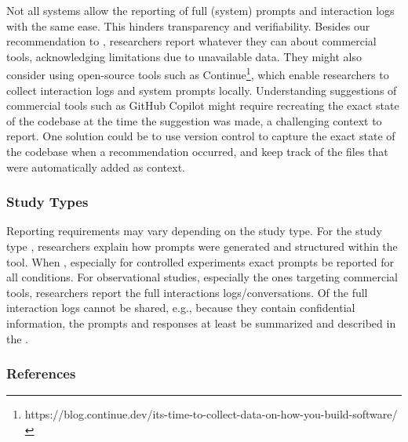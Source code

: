 Not all systems allow the reporting of full (system) prompts and interaction logs with the same ease.
This hinders transparency and verifiability.
Besides our recommendation to \openllm, researchers \should report whatever they can about commercial tools, acknowledging limitations due to unavailable data.
They might also consider using open-source tools such as Continue\footnote{https://blog.continue.dev/its-time-to-collect-data-on-how-you-build-software/}, which enable researchers to collect interaction logs and system prompts locally.
Understanding suggestions of commercial tools such as GitHub Copilot might require recreating the exact state of the codebase at the time the suggestion was made, a challenging context to report.
One solution could be to use version control to capture the exact state of the codebase when a recommendation occurred, and keep track of the files that were automatically added as context.


\subsubsection{Study Types}

Reporting requirements may vary depending on the study type.
For the study type \newtools, researchers \must explain how prompts were generated and structured within the tool.
When \llmusage, especially for controlled experiments exact prompts \must be reported for all conditions.
For observational studies, especially the ones targeting commercial tools, researchers \must report the full interactions logs/conversations.
Of the full interaction logs cannot be shared, e.g., because they contain confidential information, the prompts and responses \should at least be summarized and described in the \paper.



\subsubsection{References}





